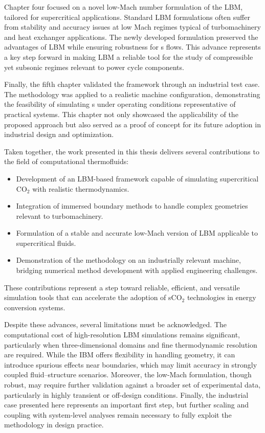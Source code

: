 Chapter four focused on a novel low-Mach number formulation of the LBM, tailored
for supercritical  applications. Standard LBM formulations often suffer from
stability and accuracy issues at low Mach regimes typical of turbomachinery and
heat exchanger applications. The newly developed formulation preserved the
advantages of LBM while ensuring robustness for s flows. This advance
represents a key step forward in making LBM a reliable tool for the study of
compressible yet subsonic regimes relevant to power cycle components.

Finally, the fifth chapter validated the framework through an industrial test
case. The methodology was applied to a realistic machine configuration,
demonstrating the feasibility of simulating s under operating conditions
representative of practical systems. This chapter not only showcased the
applicability of the proposed approach but also served as a proof of concept for
its future adoption in industrial design and optimization.


Taken together, the work presented in this thesis delivers several contributions
to the field of computational thermofluids:  
\begin{itemize}
    \item Development of an LBM-based framework capable of simulating
    supercritical CO$_2$ with realistic thermodynamics.  
    \item Integration of immersed boundary methods to handle complex geometries
    relevant to turbomachinery.  
    \item Formulation of a stable and accurate low-Mach version of LBM
    applicable to supercritical fluids.  
    \item Demonstration of the methodology on an industrially relevant machine,
    bridging numerical method development with applied engineering challenges.  
\end{itemize}

These contributions represent a step toward reliable, efficient, and versatile
simulation tools that can accelerate the adoption of sCO$_2$ technologies in
energy conversion systems.  


Despite these advances, several limitations must be acknowledged. The
computational cost of high-resolution LBM simulations remains significant,
particularly when three-dimensional domains and fine thermodynamic resolution
are required. While the IBM offers flexibility in handling geometry, it can
introduce spurious effects near boundaries, which may limit accuracy in strongly
coupled fluid--structure scenarios. Moreover, the low-Mach formulation, though
robust, may require further validation against a broader set of experimental
data, particularly in highly transient or off-design conditions. Finally, the
industrial case presented here represents an important first step, but further
scaling and coupling with system-level analyses remain necessary to fully
exploit the methodology in design practice.  

